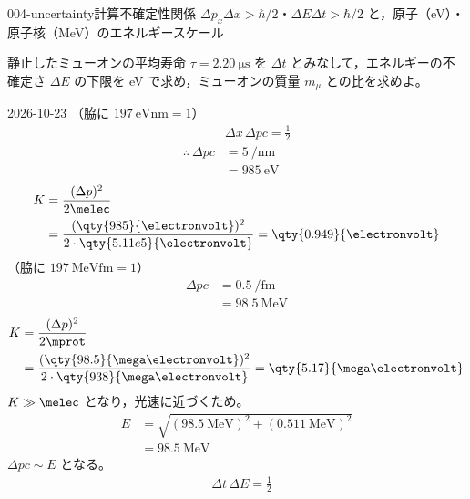 \documentclass[uplatex,dvipdfmx,a4paper,11pt]{jsarticle}
\begin{document}
\begin{mondai}{004-uncertainty}{計算}{不確定性関係 $\Delta p_x\Delta x>\hbar/2$・$\Delta E\Delta t>\hbar/2$ と，原子（\unit{\electronvolt}）・原子核（\unit{\mega\electronvolt}）のエネルギースケール}
\begin{shoumon}
    \item 静止したミューオンの平均寿命 $\tau=\qty{2.20}{\micro\second}$ を $\Delta t$ とみなして，エネルギーの不確定さ $\Delta E$ の下限を \unit{\electronvolt} で求め，ミューオンの質量 $m_\mu$ との比を求めよ。
  \end{shoumon}
\begin{kotaeutsushi}{2026-10-23}
（脇に $\qty{197}{\electronvolt\nano\metre}=1$）
\begin{align*}
  &\Delta x\,\Delta pc=\frac{1}{2}\\
  \therefore\ \Delta pc&=\qty{5}{\per\nano\metre}\\
  &=\qty{985}{\electronvolt}
\end{align*}
\begin{align*}
  K&=\frac{(\Delta p)^{2}}{2\melec}\\
  &=\frac{(\qty{985}{\electronvolt})^{2}}{2\cdot\qty{5.11e5}{\electronvolt}}=\qty{0.949}{\electronvolt}
\end{align*}
（脇に $\qty{197}{\mega\electronvolt\femto\metre}=1$）
\begin{align*}
  \Delta pc&=\qty{0.5}{\per\femto\metre}\\
  &=\qty{98.5}{\mega\electronvolt}
\end{align*}
\begin{align*}
  K&=\frac{(\Delta p)^{2}}{2\mprot}\\
  &=\frac{(\qty{98.5}{\mega\electronvolt})^{2}}{2\cdot\qty{938}{\mega\electronvolt}}=\qty{5.17}{\mega\electronvolt}
\end{align*}
$K\gg\melec$ となり，光速に近づくため。
\begin{align*}
  E&=\sqrt{(\qty{98.5}{\mega\electronvolt})^{2}+(\qty{0.511}{\mega\electronvolt})^{2}}\\
  &=\qty{98.5}{\mega\electronvolt}
\end{align*}
$\Delta pc\sim E$ となる。
\begin{align*}
  &\Delta t\,\Delta E=\frac{1}{2}\\

\end{align*}
\end{kotaeutsushi}
\end{mondai}
\end{document}
